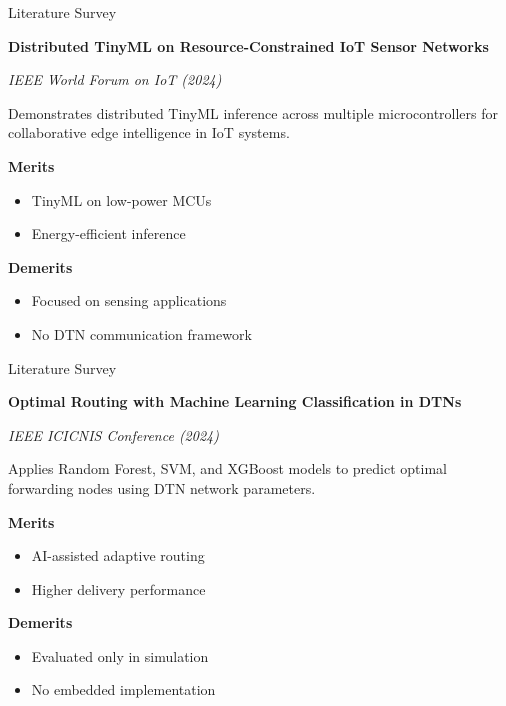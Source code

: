 \documentclass[11pt,aspectratio=43]{beamer}
\begin{document}
\begin{frame}{Literature Survey}

\textbf{Distributed TinyML on Resource-Constrained IoT Sensor Networks}

\textit{IEEE World Forum on IoT (2024)}

\vspace{0.2cm}

Demonstrates distributed TinyML inference across multiple microcontrollers for collaborative edge intelligence in IoT systems.

\vspace{0.2cm}

\textbf{Merits}
\begin{itemize}
    \item TinyML on low-power MCUs
    \item Energy-efficient inference
\end{itemize}

\textbf{Demerits}
\begin{itemize}
    \item Focused on sensing applications
    \item No DTN communication framework
\end{itemize}

\end{frame}
\begin{frame}{Literature Survey}

\textbf{Optimal Routing with Machine Learning Classification in DTNs}

\textit{IEEE ICICNIS Conference (2024)}

\vspace{0.2cm}

Applies Random Forest, SVM, and XGBoost models to predict optimal forwarding nodes using DTN network parameters.

\vspace{0.2cm}

\textbf{Merits}
\begin{itemize}
    \item AI-assisted adaptive routing
    \item Higher delivery performance
\end{itemize}

\textbf{Demerits}
\begin{itemize}
    \item Evaluated only in simulation
    \item No embedded implementation
\end{itemize}

\end{frame}
\end{document}
